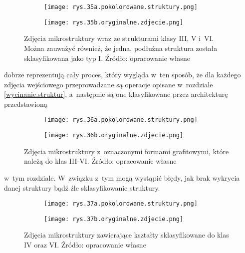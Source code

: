 \begin{figure}[h]
	\centering
	\begin{subfigure}{0.42\textwidth}
	    \centering
	    \texttt{[image: rys.35a.pokolorowane.struktury.png]}
	\end{subfigure}
	\begin{subfigure}{0.42\textwidth}
	    \centering
	    \texttt{[image: rys.35b.oryginalne.zdjecie.png]}
	\end{subfigure}
	\caption{\label{rys.35}Zdjęcia mikrostruktury wraz ze strukturami klasy III, V i~VI. Można zauważyć również, że jedna, podłużna struktura została sklasyfikowana jako typ I. Źródło: opracowanie własne}
\end{figure}
dobrze reprezentują cały proces, który wygląda w~ten sposób, że dla każdego zdjęcia wejściowego przeprowadzane są operacje opisane w~rozdziale \ref{wycinanie.struktur}, a~następnie są one klasyfikowane przez architekturę przedstawioną
\begin{figure}[h]
	\centering
	\begin{subfigure}{0.41\textwidth}
	    \centering
	    \texttt{[image: rys.36a.pokolorowane.struktury.png]}
	\end{subfigure}
	\begin{subfigure}{0.41\textwidth}
	    \centering
	    \texttt{[image: rys.36b.oryginalne.zdjecie.png]}
	\end{subfigure}
	\caption{\label{rys.36}Zdjęcia mikrostruktury z~oznaczonymi formami grafitowymi, które należą do klas III-VI. Źródło: opracowanie własne}
\end{figure}
w~tym rozdziale. W~związku z~tym mogą wystąpić błędy, jak brak wykrycia danej struktury bądź źle sklasyfikowanie struktury.
\begin{figure}[h]
	\centering
	\begin{subfigure}{0.41\textwidth}
	    \centering
	    \texttt{[image: rys.37a.pokolorowane.struktury.png]}
	\end{subfigure}
	\begin{subfigure}{0.41\textwidth}
	    \centering
	    \texttt{[image: rys.37b.oryginalne.zdjecie.png]}
	\end{subfigure}
	\caption{\label{rys.37}Zdjęcia mikrostruktury zawierające kształty sklasyfikowane do klas IV oraz VI. Źródło: opracowanie własne}
\end{figure}
